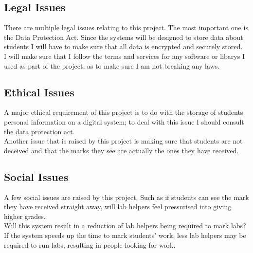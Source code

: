 \documentclass[12pt]{article}  %
\begin{document}
\subsection{Legal Issues}
There are multiple legal issues relating to this project. The most important one is the Data Protection Act. Since the systems will be designed to store data about students I will have to make sure that all data is encrypted and securely stored.\\
I will make sure that I follow the terms and services for any software or libarys I used as part of the project, as to make sure I am not breaking any laws.



\subsection{Ethical Issues}
A major ethical requirement of this project is to do with the storage of students personal information on a digital system; to deal with this issue I should consult the data protection act. \\
Another issue that is raised by this project is making sure that students are not deceived and that the marks they see are actually the ones they have received.


\subsection{Social Issues}
A few social issues are raised by this project. Such as if students can see the mark they have received straight away, will lab helpers feel pressurised into giving higher grades.\\
Will this system result in a reduction of lab helpers being required to mark labs? If the system speeds up the time to mark students’ work, less lab helpers may be required to run labs, resulting in people looking for work.







\newpage
\printbibliography
\end{document}
